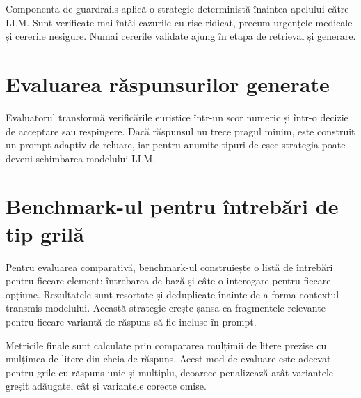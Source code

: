 \documentclass[12pt, a4paper, oneside, romanian]{teza-upb}
\begin{document}
Componenta de guardrails aplică o strategie deterministă înaintea apelului către LLM. Sunt verificate mai întâi cazurile cu risc ridicat, precum urgențele medicale și cererile nesigure. Numai cererile validate ajung în etapa de retrieval și generare.

\label{anexa:guardrail-rules}


\section{Evaluarea răspunsurilor generate}

Evaluatorul transformă verificările euristice într-un scor numeric și într-o decizie de acceptare sau respingere. Dacă răspunsul nu trece pragul minim, este construit un prompt adaptiv de reluare, iar pentru anumite tipuri de eșec strategia poate deveni schimbarea modelului LLM.

\label{anexa:evaluator-retry}


\section{Benchmark-ul pentru întrebări de tip grilă}

Pentru evaluarea comparativă, benchmark-ul construiește o listă de întrebări pentru fiecare element: întrebarea de bază și câte o interogare pentru fiecare opțiune. Rezultatele sunt resortate și deduplicate înainte de a forma contextul transmis modelului. Această strategie crește șansa ca fragmentele relevante pentru fiecare variantă de răspuns să fie incluse în prompt.

\label{anexa:benchmark-reranking}


Metricile finale sunt calculate prin compararea mulțimii de litere prezise cu mulțimea de litere din cheia de răspuns. Acest mod de evaluare este adecvat pentru grile cu răspuns unic și multiplu, deoarece penalizează atât variantele greșit adăugate, cât și variantele corecte omise.

\label{anexa:benchmark-metrics}

\end{document}
